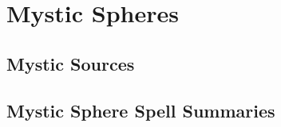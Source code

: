 \chapter{Mystic Spheres}\label{Mystic Spheres}

\section{Mystic Sources}\label{Mystic Sources}

    

\newpage
\section{Mystic Sphere Spell Summaries}\label{Mystic Sphere Spell Summaries}

    


